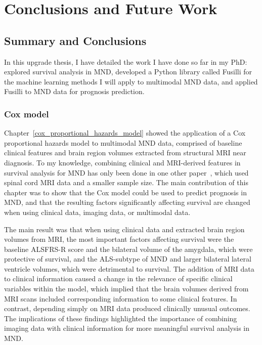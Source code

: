 \chapter{Conclusions and Future Work}
\label{conclusions_and_future_work}

\section{Summary and Conclusions}

In this upgrade thesis, I have detailed the work I have done so far in my PhD: explored survival analysis in MND, developed a Python library called Fusilli for the machine learning methods I will apply to multimodal MND data, and applied Fusilli to MND data for prognosis prediction.

\subsection{Cox model}

Chapter~\ref{cox_proportional_hazards_model} showed the application of a Cox proportional hazards model to multimodal MND data, comprised of baseline clinical features and brain region volumes extracted from structural MRI near diagnosis.
To my knowledge, combining clinical and MRI-derived features in survival analysis for MND has only been done in one other paper~\cite{querinSpinalCordMultiparametric2017}, which used spinal cord MRI data and a smaller sample size.
The main contribution of this chapter was to show that the Cox model could be used to predict prognosis in MND, and that the resulting factors significantly affecting survival are changed when using clinical data, imaging data, or multimodal data.

The main result was that when using clinical data and extracted brain region volumes from MRI, the most important factors affecting survival were the baseline ALSFRS-R score and the bilateral volume of the amygdala, which were protective of survival, and the ALS-subtype of MND and larger bilateral lateral ventricle volumes, which were detrimental to survival.
The addition of MRI data to clinical information caused a change in the relevance of specific clinical variables within the model, which implied that the brain volumes derived from MRI scans included corresponding information to some clinical features.
In contrast, depending simply on MRI data produced clinically unusual outcomes.
The implications of these findings highlighted the importance of combining imaging data with clinical information for more meaningful survival analysis in MND.

